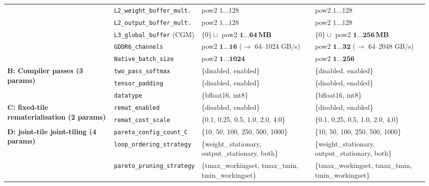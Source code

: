 \begin{table}[h]
{\begin{tabular}{llll}
 & \texttt{L2\_weight\_buffer\_mult.}  & pow2 $1 \ldots 128$                                     & pow2 $1 \ldots 128$                                    \\
 & \texttt{L2\_output\_buffer\_mult.}  & pow2 $1 \ldots 128$                                     & pow2 $1 \ldots 128$                                    \\
 & \texttt{L3\_global\_buffer} (CGM)   & $\{0\} \cup$ pow2 $\mathbf{1 \ldots 64\,\text{MB}}$     & $\{0\} \cup$ pow2 $\mathbf{1 \ldots 256\,\text{MB}}$   \\
 & \texttt{GDDR6\_channels}            & pow2 $\mathbf{1 \ldots 16}$ ($\to$ 64–1024 GB/s)        & pow2 $\mathbf{1 \ldots 32}$ ($\to$ 64–2048 GB/s)       \\
 & \texttt{Native\_batch\_size}        & pow2 $\mathbf{1 \ldots 1024}$                           & pow2 $\mathbf{1 \ldots 256}$                           \\
\midrule
\multirow{3}{*}{\textbf{B: Compiler passes (3 params)}}
 & \texttt{two\_pass\_softmax}         & \{disabled, enabled\}                                   & \{disabled, enabled\}                                  \\
 & \texttt{tensor\_padding}            & \{disabled, enabled\}                                   & \{disabled, enabled\}                                  \\
 & \texttt{datatype}                   & \{bfloat16, int8\}                                      & \{bfloat16, int8\}                                     \\
\midrule
\multirow{2}{*}{\textbf{C: fixed-tile rematerialisation (2 params)}}
 & \texttt{remat\_enabled}             & \{disabled, enabled\}                                   & \{disabled, enabled\}                                  \\
 & \texttt{remat\_cost\_scale}         & \{0.1, 0.25, 0.5, 1.0, 2.0, 4.0\}                      & \{0.1, 0.25, 0.5, 1.0, 2.0, 4.0\}                     \\
\midrule
\multirow{4}{*}{\textbf{D: joint-tile joint-tiling (4 params)}}
 & \texttt{pareto\_config\_count\_C}   & \{10, 50, 100, 250, 500, 1000\}                         & \{10, 50, 100, 250, 500, 1000\}                        \\
 & \texttt{loop\_ordering\_strategy}   & \{weight\_stationary, output\_stationary, both\}        & \{weight\_stationary, output\_stationary, both\}       \\
 & \texttt{pareto\_pruning\_strategy}  & \{tmax\_workingset, tmax\_tmin, tmin\_workingset\}      & \{tmax\_workingset, tmax\_tmin, tmin\_workingset\}     \\

\end{tabular}}
\end{table}
